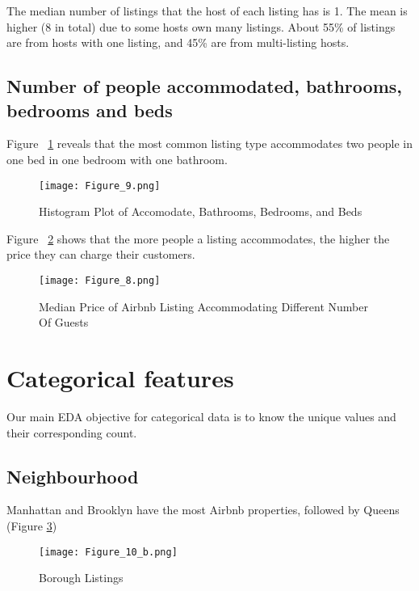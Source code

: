 The median number of listings that the host of each listing has is 1. The mean
is higher (8 in total) due to some hosts own many listings. About 55\% of
listings are from hosts with one listing, and 45\% are from multi-listing hosts.

\subsection{Number of people accommodated, bathrooms, bedrooms and beds}

Figure ~\ref{fig:hist-accommodates} reveals that the most common listing type accommodates two people in
one bed in one bedroom with one bathroom.

\begin{figure}[H] \centering
\caption{Histogram Plot of Accomodate, Bathrooms, Bedrooms, and Beds}
    \texttt{[image: Figure\_9.png]}
    \label{fig:hist-accommodates}
\end{figure}

Figure ~\ref{fig:median-price-accommodates} shows that the more people a listing accommodates, the higher the
price they can charge their customers.

\begin{figure}[H] \centering
\caption{Median Price of Airbnb Listing Accommodating Different Number Of Guests}
    \texttt{[image: Figure\_8.png]}
    \label{fig:median-price-accommodates}
\end{figure}

\section{Categorical features}
\label{sec:categorical_features}

Our main EDA objective for categorical data is to know the unique values and
their corresponding count.

\subsection{Neighbourhood}

Manhattan and Brooklyn have the most Airbnb properties, followed by
Queens (Figure \ref{fig:borough-number-of-listing})
\begin{figure}[H] \centering
\caption{Borough Listings}
    \texttt{[image: Figure\_10\_b.png]}
    \label{fig:borough-number-of-listing}
\end{figure}

